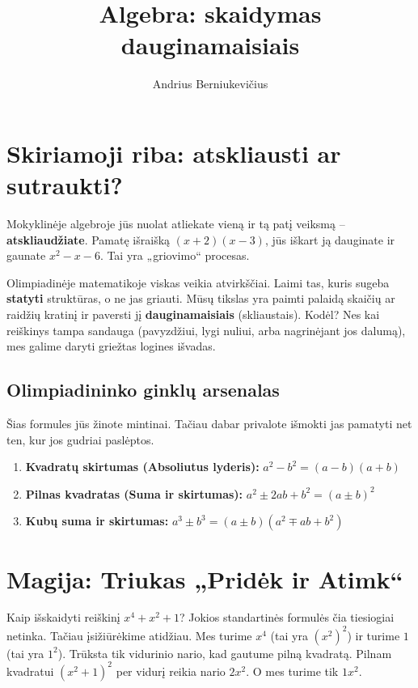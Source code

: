 \documentclass[11pt,a4paper]{scrartcl}
\title{Algebra: skaidymas dauginamaisiais}
\author{Andrius Berniukevičius}
\begin{document}
\maketitle

\section{Skiriamoji riba: atskliausti ar sutraukti?}

Mokyklinėje algebroje jūs nuolat atliekate vieną ir tą patį veiksmą – \textbf{atskliaudžiate}. Pamatę išraišką $(x+2)(x-3)$, jūs iškart ją dauginate ir gaunate $x^2 - x - 6$. Tai yra „griovimo“ procesas. 

Olimpiadinėje matematikoje viskas veikia atvirkščiai. Laimi tas, kuris sugeba \textbf{statyti} struktūras, o ne jas griauti. Mūsų tikslas yra paimti palaidą skaičių ar raidžių kratinį ir paversti jį \textbf{dauginamaisiais} (skliaustais). Kodėl? Nes kai reiškinys tampa sandauga (pavyzdžiui, lygi nuliui, arba nagrinėjant jos dalumą), mes galime daryti griežtas logines išvadas.

\subsection*{Olimpiadininko ginklų arsenalas}
Šias formules jūs žinote mintinai. Tačiau dabar privalote išmokti jas pamatyti net ten, kur jos gudriai paslėptos.

\begin{enumerate}
    \item \textbf{Kvadratų skirtumas (Absoliutus lyderis):} $a^2 - b^2 = (a-b)(a+b)$
    \item \textbf{Pilnas kvadratas (Suma ir skirtumas):} $a^2 \pm 2ab + b^2 = (a \pm b)^2$
    \item \textbf{Kubų suma ir skirtumas:} $a^3 \pm b^3 = (a \pm b)(a^2 \mp ab + b^2)$
\end{enumerate}

\section{Magija: Triukas „Pridėk ir Atimk“}

Kaip išskaidyti reiškinį $x^4 + x^2 + 1$? 
Jokios standartinės formulės čia tiesiogiai netinka. Tačiau įsižiūrėkime atidžiau. Mes turime $x^4$ (tai yra $(x^2)^2$) ir turime $1$ (tai yra $1^2$). Trūksta tik vidurinio nario, kad gautume pilną kvadratą. Pilnam kvadratui $(x^2 + 1)^2$ per vidurį reikia nario $2x^2$. O mes turime tik $1x^2$.
\end{document}
